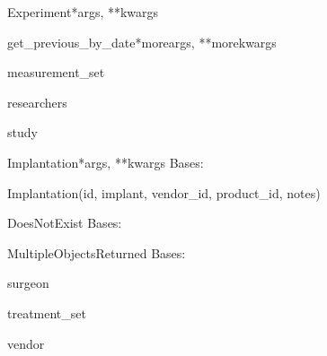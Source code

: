 \documentclass[letterpaper,10pt,english]{sphinxmanual}
\begin{document}
\begin{classdesc}{Experiment}{*args, **kwargs}
\hypertarget{data.models.Experiment.get\_previous\_by\_date}{}\begin{methoddesc}[Experiment]{get\_previous\_by\_date}{*moreargs, **morekwargs}\end{methoddesc}

\hypertarget{data.models.Experiment.measurement\_set}{}\begin{memberdesc}[Experiment]{measurement\_set}\end{memberdesc}

\hypertarget{data.models.Experiment.researchers}{}\begin{memberdesc}[Experiment]{researchers}\end{memberdesc}

\hypertarget{data.models.Experiment.study}{}\begin{memberdesc}[Experiment]{study}\end{memberdesc}
\end{classdesc}

\hypertarget{data.models.Implantation}{}\begin{classdesc}{Implantation}{*args, **kwargs}
Bases: 

Implantation(id, implant, vendor\_id, product\_id, notes)

\hypertarget{data.models.Implantation.DoesNotExist}{}\begin{excdesc}{DoesNotExist}
Bases: 
\end{excdesc}

\hypertarget{data.models.Implantation.MultipleObjectsReturned}{}\begin{excdesc}{MultipleObjectsReturned}
Bases: 
\end{excdesc}

\hypertarget{data.models.Implantation.surgeon}{}\begin{memberdesc}[Implantation]{surgeon}\end{memberdesc}

\hypertarget{data.models.Implantation.treatment\_set}{}\begin{memberdesc}[Implantation]{treatment\_set}\end{memberdesc}

\hypertarget{data.models.Implantation.vendor}{}\begin{memberdesc}[Implantation]{vendor}\end{memberdesc}
\end{classdesc}
\end{document}
